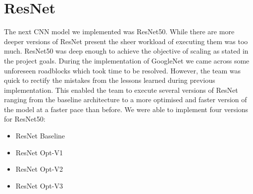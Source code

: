 \section{ResNet}
The next CNN model we implemented was ResNet50. While there are more deeper versions of ResNet present the sheer workload of executing them was too much. ResNet50 was deep enough to achieve the objective of scaling as stated in the project goals. During the implementation of GoogleNet we came across some unforeseen roadblocks which took time to be resolved. However, the team was quick to rectify the mistakes from the lessons learned during previous implementation. This enabled the team to execute several versions of ResNet ranging from the baseline architecture to a more optimised and faster version of the model at a faster pace than before.
We were able to implement four versions for ResNet50:
\begin{itemize}
    \item ResNet Baseline
    \item ResNet Opt-V1
    \item ResNet Opt-V2
    \item ResNet Opt-V3
\end{itemize}


